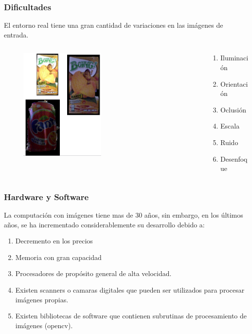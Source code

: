 \begin{frame}\frametitle{Dificultades}

  El entorno real tiene una gran cantidad de variaciones en las imágenes de entrada.
  \begin{columns}
    \begin{column}{0.5\textwidth}
\begin{figure} %
    \centering
    \includegraphics[width=0.5\textwidth]{Figures/ComputerVisionProblems.png}
\end{figure}
    \end{column}
    \begin{column}{0.5\textwidth}
\begin{enumerate}
\item Iluminación
\item Orientación
\item Oclusión
\item Escala
\item Ruido
\item Desenfoque
\end{enumerate}
    \end{column}
  \end{columns}
\end{frame}

\begin{frame}\frametitle{Hardware y Software}
La computación con imágenes tiene mas de 30 años, sin embargo, en los últimos años, se ha incrementado considerablemente su desarrollo debido a:
\begin{enumerate}
\item Decremento en los precios 
\item Memoria con gran capacidad
\item Procesadores de propósito general de alta velocidad.
\item Existen scanners o camaras digitales que pueden ser utilizados para procesar imágenes propias.
\item Existen bibliotecas de software que contienen subrutinas de procesamiento de imágenes (opencv).
\end{enumerate}
\end{frame}

